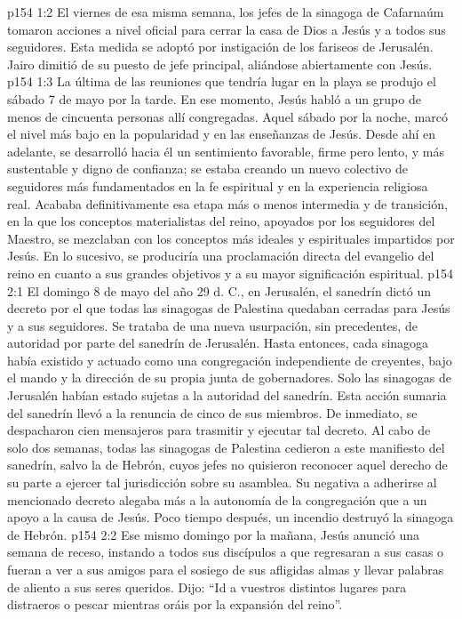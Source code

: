 \vs p154 1:2 El viernes de esa misma semana, los jefes de la sinagoga de Cafarnaúm tomaron acciones a nivel oficial para cerrar la casa de Dios a Jesús y a todos sus seguidores. Esta medida se adoptó por instigación de los fariseos de Jerusalén. Jairo dimitió de su puesto de jefe principal, aliándose abiertamente con Jesús.
\vs p154 1:3 La última de las reuniones que tendría lugar en la playa se produjo el sábado 7 de mayo por la tarde. En ese momento, Jesús habló a un grupo de menos de cincuenta personas allí congregadas. Aquel sábado por la noche, marcó el nivel más bajo en la popularidad y en las enseñanzas de Jesús. Desde ahí en adelante, se desarrolló hacia él un sentimiento favorable, firme pero lento, y más sustentable y digno de confianza; se estaba creando un nuevo colectivo de seguidores más fundamentados en la fe espiritual y en la experiencia religiosa real. Acababa definitivamente esa etapa más o menos intermedia y de transición, en la que los conceptos materialistas del reino, apoyados por los seguidores del Maestro, se mezclaban con los conceptos más ideales y espirituales impartidos por Jesús. En lo sucesivo, se produciría una proclamación directa del evangelio del reino en cuanto a sus grandes objetivos y a su mayor significación espiritual.
\vs p154 2:1 El domingo 8 de mayo del año 29 d. C., en Jerusalén, el sanedrín dictó un decreto por el que todas las sinagogas de Palestina quedaban cerradas para Jesús y a sus seguidores. Se trataba de una nueva usurpación, sin precedentes, de autoridad por parte del sanedrín de Jerusalén. Hasta entonces, cada sinagoga había existido y actuado como una congregación independiente de creyentes, bajo el mando y la dirección de su propia junta de gobernadores. Solo las sinagogas de Jerusalén habían estado sujetas a la autoridad del sanedrín. Esta acción sumaria del sanedrín llevó a la renuncia de cinco de sus miembros. De inmediato, se despacharon cien mensajeros para trasmitir y ejecutar tal decreto. Al cabo de solo dos semanas, todas las sinagogas de Palestina cedieron a este manifiesto del sanedrín, salvo la de Hebrón, cuyos jefes no quisieron reconocer aquel derecho de su parte a ejercer tal jurisdicción sobre su asamblea. Su negativa a adherirse al mencionado decreto alegaba más a la autonomía de la congregación que a un apoyo a la causa de Jesús. Poco tiempo después, un incendio destruyó la sinagoga de Hebrón.
\vs p154 2:2 \pc Ese mismo domingo por la mañana, Jesús anunció una semana de receso, instando a todos sus discípulos a que regresaran a sus casas o fueran a ver a sus amigos para el sosiego de sus afligidas almas y llevar palabras de aliento a sus seres queridos. Dijo: “Id a vuestros distintos lugares para distraeros o pescar mientras oráis por la expansión del reino”.
